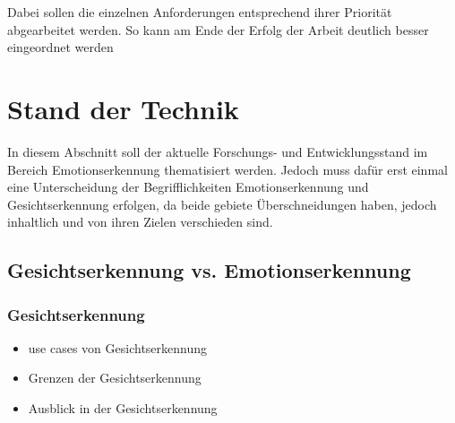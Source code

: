 \documentclass[12pt, a4paper]{scrbook}
\begin{document}
Dabei sollen die einzelnen Anforderungen entsprechend ihrer Priorität abgearbeitet werden. So kann am Ende der Erfolg der Arbeit deutlich besser eingeordnet werden



\let\cleardoublepage\relax





\chapter{Stand der Technik}


In diesem Abschnitt soll der aktuelle Forschungs- und Entwicklungsstand im Bereich Emotionserkennung thematisiert werden. Jedoch muss dafür erst einmal eine Unterscheidung der Begrifflichkeiten
Emotionserkennung und Gesichtserkennung erfolgen, da beide gebiete Überschneidungen haben, jedoch inhaltlich und von ihren Zielen verschieden sind.



\section{Gesichtserkennung vs. Emotionserkennung}
\subsection{Gesichtserkennung}

\begin{itemize}
\item use cases von Gesichtserkennung
\item Grenzen der Gesichtserkennung
\item Ausblick in der Gesichtserkennung
\end{itemize}
\end{document}
